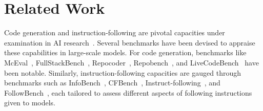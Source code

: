 \section{Related Work}

Code generation and instruction-following are pivotal capacities under examination in AI research~\cite{feng2020codebert,unicoder,wizardcoder,wang2023codet5+,kim2018deepcode,li2023starcoder,lu2021codexglue,li2022competition,wei2023magicoder,nijkamp2022codegen,zhuo2024bigcodebench,jain2024livecodebench,nijkamp2023codegen2,zhang2023repocoder,allal2023santacoder,lozhkov2024starcoder,roziere2023codellama,lozhkov2024starcoder2,wang-etal-2021-codet5,yan2023codetransocean}. Several benchmarks have been devised to appraise these capabilities in large-scale models. For code generation, benchmarks like McEval~\cite{mceval}, FullStackBench~\cite{liu2024fullstackbenchevaluatingllms}, Repocoder~\cite{zhang2023repocoder}, Repobench~\cite{liu2023repobench}, and LiveCodeBench~\cite{jain2024livecodebench} have been notable. Similarly, instruction-following capacities are gauged through benchmarks such as InfoBench~\cite{qin2024infobenchevaluatinginstructionfollowing}, CFBench~\cite{zhang2024cfbenchcomprehensiveconstraintsfollowingbenchmark}, Instruct-following~\cite{zhou2023instructionfollowingevaluationlargelanguage}, and FollowBench~\cite{jiang2024followbenchmultilevelfinegrainedconstraints}, each tailored to assess different aspects of following instructions given to models.